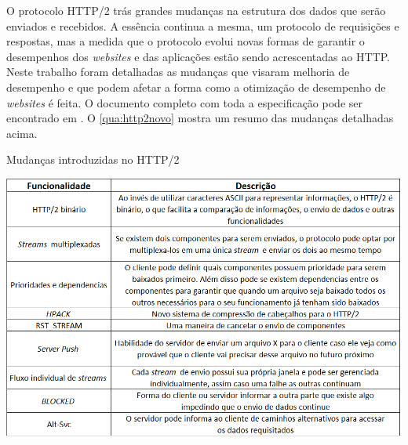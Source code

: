 O protocolo HTTP/2 trás grandes mudanças na estrutura dos dados que serão enviados e recebidos. A essência continua a mesma, um protocolo de requisições e respostas, mas a medida que o protocolo evolui novas formas de garantir o desempenhos dos \textit{websites} e das aplicações estão sendo acrescentadas ao HTTP. Neste trabalho foram detalhadas as mudanças que visaram melhoria de desempenho e que podem afetar a forma como a otimização de desempenho de \textit{websites} é feita. O documento completo com toda a especificação pode ser encontrado em \cite{HTTP2Spec}. O \autoref{qua:http2novo} mostra um resumo das mudanças detalhadas acima.

\begin{quadro}[H]
	\caption{Mudanças introduzidas no HTTP/2}
	\centering
	\includegraphics[width=1.0\textwidth]{./04-figuras/fund-teorica/http2novo}
	\label{qua:http2novo}
\end{quadro}

